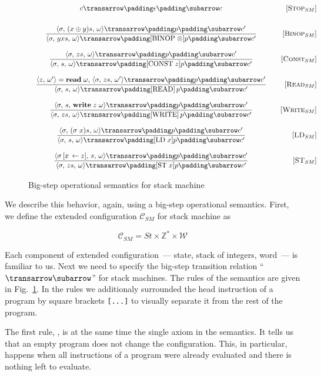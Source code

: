 \begin{figure}[t]
  \[
  \def\arraystretch{3}
  \arraycolsep=10pt
  \def\arraystretch{3}
  \begin{array}{cr} 
  \trans{c}{\epsilon}{c}&\ruleno{Stop$_{SM}$}\\
  \trule{\trans{\inbr{\sigma,\,(x\oplus y)s,\,\omega}}{p}{c^\prime}}{\trans{\inbr{\sigma,\,yxs,\,\omega}}{[\llang{BINOP $\;\otimes$}]p}{c^\prime}}&\ruleno{Binop$_{SM}$}\\
  \trule{\trans{\inbr{\sigma,\,zs,\,\omega}}{p}{c^\prime}}{\trans{\inbr{\sigma,\,s,\,\omega}}{[\llang{CONST $\;z$}]p}{c^\prime}}&\ruleno{Const$_{SM}$}\\
  \trule{\inbr{z,\,\omega^\prime}=\primi{read}{\;\omega},\,\trans{\inbr{\sigma,\,zs,\,\omega^\prime}}{p}{c^\prime}}{\trans{\inbr{\sigma,\,s,\,\omega}}{[\llang{READ}]\,p}{c^\prime}}&\ruleno{Read$_{SM}$}\\
  \trule{\trans{\inbr{\sigma,\,s,\,\primi{write}{\;z\;\omega}}}{p}{c^\prime}}{\trans{\inbr{\sigma,\,zs,\,\omega}}{[\llang{WRITE}]\,p}{c^\prime}}&\ruleno{Write$_{SM}$}\\
  \trule{\trans{\inbr{\sigma,\,(\sigma\;x)s,\,\omega}}{p}{c^\prime}}{\trans{\inbr{\sigma,\,s,\,\omega}}{[\llang{LD $\;x$}]p}{c^\prime}}&\ruleno{LD$_{SM}$}\\
  \trule{\trans{\inbr{\sigma\,[x\,\gets z],\,s,\,\omega}}{p}{c^\prime}}{\trans{\inbr{\sigma,\,zs,\,\omega}}{[\llang{ST $\;x$}]p}{c^\prime}}&\ruleno{ST$_{SM}$}
  \end{array}
  \]
  \caption{Big-step operational semantics for stack machine}
  \label{sm-bigstep}
\end{figure}

We describe this behavior, again, using a big-step operational semantics. First, we define the extended configuration $\mathscr{C}_{SM}$
for stack machine as

\[
\mathscr{C}_{SM}=St\times\mathbb{Z}^*\times\mathscr{W}
\]

Each component of extended configuration~--- state, stack of integers, word~--- is familiar to us. Next we need
to specify the big-step transition relation \mbox{``$\transrel$''} for stack machines. The rules of the semantics
are given in Fig.~\ref{sm-bigstep}. In the rules we additionaly surrounded the head instruction of a program
by square brackets \lstinline|[...]| to visually separate it from the rest of the program.

The first rule, , is at the same time the single axiom in the semantics. It tells us that an empty
program does not change the configuration. This, in particular, happens when all instructions of a program were
already evaluated and there is nothing left to evaluate.

